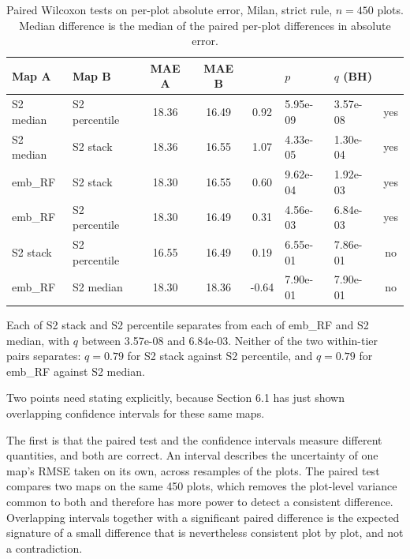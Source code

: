 \documentclass[11pt,a4paper]{article}
\begin{document}
\begin{table}[htbp]
  \centering
  \caption{Paired Wilcoxon tests on per-plot absolute error, Milan, strict rule,
  $n = 450$ plots. Median difference is the median of the paired per-plot
  differences in absolute error.}
  \label{tab:paired-wilcoxon}
  \setlength{\tabcolsep}{4pt}
  \begin{tabular}{l l S[table-format=2.2] S[table-format=2.2] S[table-format=-1.2] l l c}
    \toprule
    {Map A} & {Map B} & {MAE A} & {MAE B} & {} & {$p$} & {$q$ (BH)} & {} \\
    \midrule
    S2 median & S2 percentile & 18.36 & 16.49 & 0.92  & 5.95e-09 & 3.57e-08 & yes \\
    S2 median & S2 stack      & 18.36 & 16.55 & 1.07  & 4.33e-05 & 1.30e-04 & yes \\
    emb\_RF   & S2 stack      & 18.30 & 16.55 & 0.60  & 9.62e-04 & 1.92e-03 & yes \\
    emb\_RF   & S2 percentile & 18.30 & 16.49 & 0.31  & 4.56e-03 & 6.84e-03 & yes \\
    S2 stack  & S2 percentile & 16.55 & 16.49 & 0.19  & 6.55e-01 & 7.86e-01 & no  \\
    emb\_RF   & S2 median     & 18.30 & 18.36 & -0.64 & 7.90e-01 & 7.90e-01 & no  \\
    \bottomrule
  \end{tabular}
\end{table}

Each of S2 stack and S2 percentile separates from each of emb\_RF and S2 median,
with $q$ between 3.57e-08 and 6.84e-03. Neither of the two within-tier pairs
separates: $q = 0.79$ for S2 stack against S2 percentile, and $q = 0.79$ for
emb\_RF against S2 median.

Two points need stating explicitly, because Section 6.1 has just shown
overlapping confidence intervals for these same maps.

The first is that the paired test and the confidence intervals measure different
quantities, and both are correct. An interval describes the uncertainty of one
map's RMSE taken on its own, across resamples of the plots. The paired test
compares two maps on the same 450 plots, which removes the plot-level variance
common to both and therefore has more power to detect a consistent difference.
Overlapping intervals together with a significant paired difference is the
expected signature of a small difference that is nevertheless consistent
plot by plot, and not a contradiction.
\end{document}
